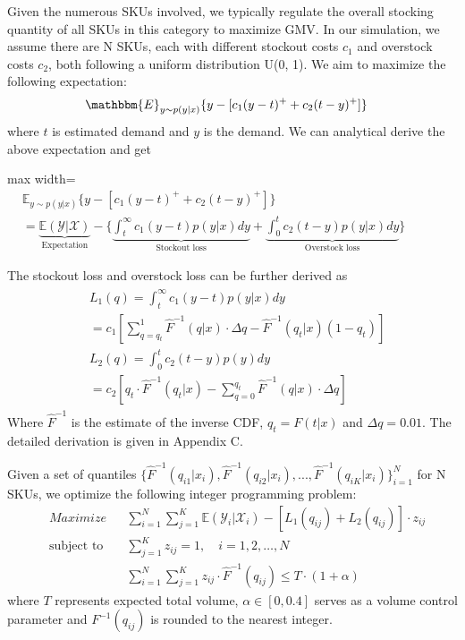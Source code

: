 \documentclass[sigconf]{acmart}
\begin{document}
Given the numerous SKUs involved, we typically regulate the overall stocking quantity of all SKUs in this category to maximize GMV. In our simulation, we assume there are N SKUs, each with different stockout costs $c_1$ and overstock costs $c_2$, both following a uniform distribution U(0, 1). We aim to maximize the following expectation:
\begin{align*}
    & \mathbbm{E}_{y \sim p(y|x)}\{y -[c_1(y - t)^{+} + c_2(t - y)^{+}]\}
\end{align*}
where $t$ is estimated demand and $y$ is the demand. We can analytical derive the above expectation and get

\begin{adjustbox}{max width=\linewidth}
$\displaystyle
\begin{aligned}
    & \mathbb{E}_{y \sim p(y|x)}\{y - [c_1(y - t)^{+} + c_2(t - y)^{+}]\} \\
    & = \underbrace{\mathbb{E}(\mathcal{Y}|\mathcal{X})}_{\text{Expectation}} - \{\underbrace{\int_{t}^{\infty}c_1(y - t)p(y|x) dy}_{\text{Stockout loss}} + \underbrace{\int_{0}^{t}c_2(t - y)p(y|x)dy}_{\text{Overstock loss}} \}
\end{aligned}$
\end{adjustbox}

The stockout loss and overstock loss can be further derived as
\begin{align*}
\begin{split}
    & L_1(q)  = \int_{t}^{\infty}c_1(y - t)p(y|x) dy \\
    & = c_1[\sum_{q = q_t}^{1} \hat{F}^{-1}(q|x) \cdot \Delta q -  \hat{F}^{-1}(q_t|x)(1 - q_t)] \\ 
    & L_2(q) = \int_{0}^{t}c_2(t - y)p(y)dy\\
    & = c_2[q_t \cdot \hat{F}^{-1}(q_t|x) - \sum_{q = 0}^{q_t}\hat{F}^{-1}(q|x) \cdot \Delta q ]
\end{split}
\end{align*}
Where $\hat{F}^{-1}$ is the estimate of the inverse CDF, $q_t = F(t|x)$ and $\Delta q = 0.01$. The detailed derivation is given in Appendix C.

Given a set of quantiles $\{ \hat{F}^{-1}(q_{i1}|x_i), \hat{F}^{-1}(q_{i2}|x_i), ..., \hat{F}^{-1}(q_{iK}|x_i)\}_{i = 1}^{N}$ for N SKUs, we optimize the following integer programming problem:
\begin{align*}
    & \textit{Maximize} && \sum_{i=1}^{N} \sum_{j=1}^{K} \mathbb{E}(\mathcal{Y}_i|\mathcal{X}_i) - [L_1(q_{ij}) + L_2(q_{ij})]  \cdot z_{ij} \\
    & \text{subject to} && \sum_{j = 1}^{K} z_{ij} = 1, \quad i = 1,2,\ldots,N \\
    & &&  \sum_{i=1}^{N} \sum_{j=1}^{K}z_{ij} \cdot \hat{F}^{-1}(q_{ij}) \le T \cdot (1 + \alpha)
\end{align*}
where $T$ represents expected total volume, $\alpha \in [0, 0.4]$ serves as a volume control parameter and $F^{-1}(q_{ij})$ is rounded to the nearest integer. 
\end{document}
